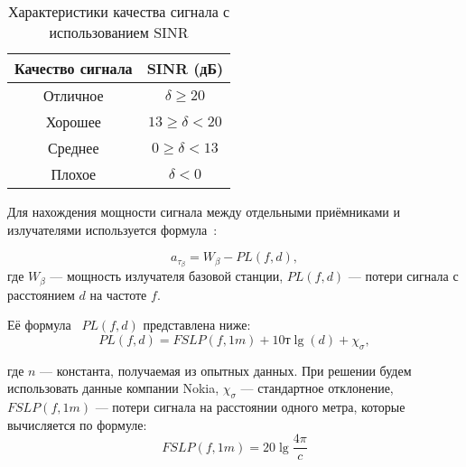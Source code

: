 \captionsetup{justification=raggedright, singlelinecheck=false}
\begin{table}[H]
	\centering
	\begin{threeparttable}
	\caption{\label{tbl:sig-quality}Характеристики качества сигнала с использованием SINR}
	\begin{tabular}{|c|c|}
		\hline
		Качество сигнала & SINR (дБ)\\\hline
		Отличное& $\delta \ge 20$\\\hline
		Хорошее& $13 \ge \delta < 20$ \\\hline
		Среднее& $0 \ge \delta < 13$ \\\hline
		Плохое& $\delta < 0$\\\hline
	\end{tabular}	
\end{threeparttable}
\end{table}

Для нахождения мощности сигнала между отдельными приёмниками и 
излучателями  используется формула~\cite{atb}:

\begin{equation}
	a_\tau_\beta = W_\beta - PL(f, d),
\end{equation}
где $W_\beta$ --- мощность излучателя базовой станции, $PL(f, d)$ --- потери 
сигнала с расстоянием $d$ на частоте $f$. 

Её формула~\cite{pl} $PL(f, d)$ представлена ниже:
\begin{equation}
	PL(f, d) = FSLP(f, 1m) + 10т\lg(d) + \chi_\sigma,
\end{equation}

где $n$ --- константа, получаемая из опытных данных. При решении будем
использовать данные компании Nokia, $\chi_\sigma$ --- стандартное отклонение, $FSLP(f, 1m)$ --- потери сигнала на расстоянии одного метра, которые вычисляется по 
формуле:
\begin{equation}
	FSLP(f, 1m)= 20 \lg\frac{4\pi}{c}
\end{equation}